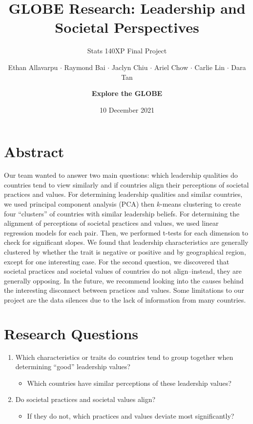 \documentclass[
]{article}
\title{GLOBE Research: Leadership and Societal Perspectives}
\subtitle{Stats 140XP Final Project}
\author{Ethan Allavarpu \(\cdot\) Raymond Bai \(\cdot\) Jaclyn Chiu
\(\cdot\) Ariel Chow \(\cdot\) Carlie Lin \(\cdot\) Dara
Tan \and \textbf{Explore the GLOBE}}
\date{10 December 2021}
\providecommand{\tightlist}{%
  \setlength{\itemsep}{0pt}\setlength{\parskip}{0pt}}
\begin{document}
\maketitle

{
\setcounter{tocdepth}{1}
\tableofcontents
}
\newpage

\hypertarget{abstract}{%
\section{Abstract}\label{abstract}}

Our team wanted to answer two main questions: which leadership qualities
do countries tend to view similarly and if countries align their
perceptions of societal practices and values. For determining leadership
qualities and similar countries, we used principal component analysis
(PCA) then \(k\)-means clustering to create four ``clusters'' of
countries with similar leadership beliefs. For determining the alignment
of perceptions of societal practices and values, we used linear
regression models for each pair. Then, we performed t-tests for each
dimension to check for significant slopes. We found that leadership
characteristics are generally clustered by whether the trait is negative
or positive and by geographical region, except for one interesting case.
For the second question, we discovered that societal practices and
societal values of countries do not align--instead, they are generally
opposing. In the future, we recommend looking into the causes behind the
interesting disconnect between practices and values. Some limitations to
our project are the data silences due to the lack of information from
many countries.

\hypertarget{research-questions}{%
\section{Research Questions}\label{research-questions}}

\begin{enumerate}
\def\labelenumi{\arabic{enumi}.}
\tightlist
\item
  Which characteristics or traits do countries tend to group together
  when determining ``good'' leadership values?

  \begin{itemize}
  \tightlist
  \item
    Which countries have similar perceptions of these leadership values?
  \end{itemize}
\item
  Do societal practices and societal values align?

  \begin{itemize}
  \tightlist
  \item
    If they do not, which practices and values deviate most
    significantly?
  \end{itemize}
\end{enumerate}
\end{document}
